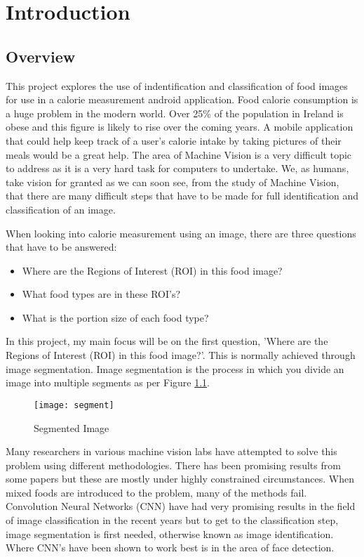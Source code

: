 \chapter{Introduction}
\label{intro}

\section{Overview}
This project explores the use of indentification and classification of food images for use in a calorie measurement android application.
Food calorie consumption is a huge problem in the modern world.
Over 25\% of the population in Ireland is obese and this figure is likely to rise over the coming years.
A mobile application that could help keep track of a user's calorie intake by taking pictures of their meals would be a great help.
The area of Machine Vision is a very difficult topic to address as it is a very hard task for computers to undertake.
We, as humans, take vision for granted as we can soon see, from the study of Machine Vision, that there are many difficult steps that have to be made for full identification and classification of an image.

When looking into calorie measurement using an image, there are three questions that have to be answered:
\begin{itemize}
\item{Where are the Regions of Interest (ROI) in this food image?}
\item{What food types are in these ROI's?}
\item{What is the portion size of each food type?}
\end{itemize}
In this project, my main focus will be on the first question, 'Where are the
Regions of Interest (ROI) in this food image?'. This is normally achieved
through image segmentation. Image segmentation is the process in which you
divide an image into multiple segments as per Figure \ref{fig:imageSeg}.

\begin{figure}
	\texttt{[image: segment]}
	\caption{Segmented Image}
	\label{fig:imageSeg}
\end{figure}

Many researchers in various machine vision labs have attempted to solve this
problem using different methodologies.
There has been promising results from some papers but these are mostly under highly constrained circumstances.
When mixed foods are introduced to the problem, many of the methods fail.
Convolution Neural Networks (CNN) have had very promising results in the field of image classification in the recent years but to get to the classification step, image segmentation is first needed, otherwise known as image identification.
Where CNN's have been shown to work best is in the area of face detection.

